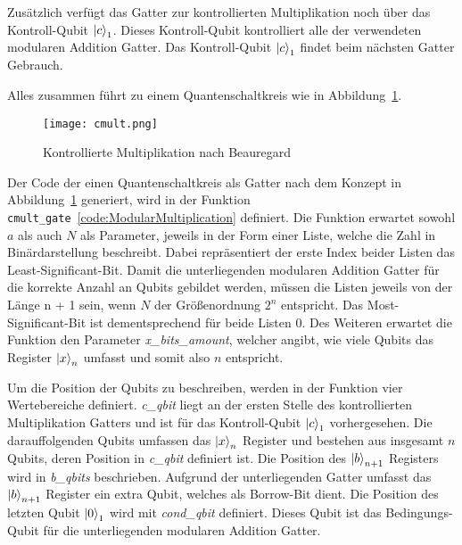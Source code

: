 Zusätzlich verfügt das Gatter zur kontrollierten Multiplikation noch über das Kontroll-Qubit \(\ket{c}_1\).
Dieses Kontroll-Qubit kontrolliert alle der verwendeten modularen Addition Gatter.
Das Kontroll-Qubit \(\ket{c}_1\) findet beim nächsten Gatter Gebrauch.

Alles zusammen führt zu einem Quantenschaltkreis wie in Abbildung~\ref{fig:cmult}.
\begin{figure} [H]
  \caption{Kontrollierte Multiplikation nach Beauregard~\cite{beauregard2003circuit}}
  \label{fig:cmult}
  \texttt{[image: cmult.png]}
  \centering
  \end{figure}



\vspace{1em}

Der Code der einen Quantenschaltkreis als Gatter nach dem Konzept in Abbildung~\ref{fig:cmult} generiert, 
wird in der Funktion \texttt{cmult\_gate}~\ref{code:ModularMultiplication} definiert.
Die Funktion erwartet sowohl \(a\) als auch \(N\) als Parameter, 
jeweils in der Form einer Liste, welche die Zahl in Binärdarstellung beschreibt.
Dabei repräsentiert der erste Index beider Listen das Least-Significant-Bit.
Damit die unterliegenden modularen Addition Gatter für die korrekte Anzahl an Qubits gebildet werden, 
müssen die Listen jeweils von der Länge n + 1 sein, wenn \(N\) der Größenordnung \(2^n\) entspricht.
Das Most-Significant-Bit ist dementsprechend für beide Listen \(0\).
Des Weiteren erwartet die Funktion den Parameter \textit{x\_bits\_amount}, welcher angibt, 
wie viele Qubits das Register \(\ket{x}_n\) umfasst 
und somit also \(n\) entspricht. 

Um die Position der Qubits zu beschreiben, 
werden in der Funktion vier Wertebereiche definiert.
\textit{c\_qbit} liegt an der ersten Stelle des kontrollierten Multiplikation Gatters und 
ist für das Kontroll-Qubit \(\ket{c}_1\) vorhergesehen.
Die darauffolgenden Qubits umfassen das \(\ket{x}_n\) Register und bestehen aus insgesamt \(n\) Qubits, 
deren Position in \textit{c\_qbit} definiert ist.
Die Position des \(\ket{b}_{n+1}\) Registers wird in \textit{b\_qbits} beschrieben.
Aufgrund der unterliegenden Gatter umfasst das \(\ket{b}_{n+1}\) Register ein extra Qubit, 
welches als Borrow-Bit dient.
Die Position des letzten Qubit \(\ket{0}_1\) wird mit \textit{cond\_qbit} definiert.
Dieses Qubit ist das Bedingungs-Qubit für die unterliegenden modularen Addition Gatter.


